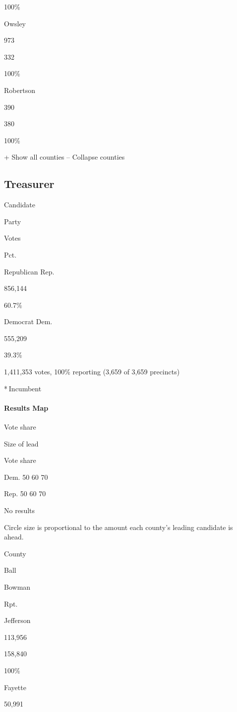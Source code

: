 100\%

Owsley

973

332

100\%

Robertson

390

380

100\%

+ Show all counties -- Collapse counties

\hypertarget{treasurer}{%
\subsection{Treasurer}\label{treasurer}}

Candidate

Party

Votes

Pct.

Republican Rep.

856,144

60.7\%

Democrat Dem.

555,209

39.3\%

1,411,353 votes, 100\% reporting (3,659 of 3,659 precincts)

* Incumbent

\hypertarget{results-map-5}{%
\paragraph{Results Map}\label{results-map-5}}

Vote share

Size of lead

Vote share

Dem. 50 60 70

Rep. 50 60 70

No results

Circle size is proportional to the amount each county's leading
candidate is ahead.

County

Ball

Bowman

Rpt.

Jefferson

113,956

158,840

100\%

Fayette

50,991

